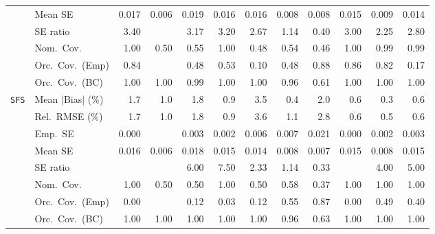 \begin{landscape}
\begin{longtable}{llrrrrrrrrrr}
 & Mean SE & 0.017 & 0.006 & 0.019 & 0.016 & 0.016 & 0.008 & 0.008 & 0.015 & 0.009 & 0.014 \\
 & SE ratio & 3.40 &  & 3.17 & 3.20 & 2.67 & \cellcolor{rankone}1.14 & \cellcolor{ranktwo}0.40 & 3.00 & \cellcolor{rankthree}2.25 & 2.80 \\
 & Nom.\ Cov. & \cellcolor{ranktwo}1.00 & 0.50 & \cellcolor{rankthree}0.55 & \cellcolor{ranktwo}1.00 & 0.48 & 0.54 & 0.46 & \cellcolor{ranktwo}1.00 & \cellcolor{rankone}0.99 & \cellcolor{rankone}0.99 \\
 & Orc.\ Cov.\ (Emp) & \cellcolor{rankthree}0.84 &  & 0.48 & 0.53 & 0.10 & 0.48 & \cellcolor{rankone}0.88 & \cellcolor{ranktwo}0.86 & 0.82 & 0.17 \\
 & Orc.\ Cov.\ (BC) & \cellcolor{rankthree}1.00 & \cellcolor{rankthree}1.00 & \cellcolor{ranktwo}0.99 & \cellcolor{rankthree}1.00 & \cellcolor{rankthree}1.00 & \cellcolor{rankone}0.96 & 0.61 & \cellcolor{rankthree}1.00 & \cellcolor{rankthree}1.00 & \cellcolor{rankthree}1.00 \\
\addlinespace[2pt]
\quad \texttt{SFS} & Mean $|$Bias$|$ (\%) & 1.7 & 1.0 & 1.8 & 0.9 & 3.5 & \cellcolor{ranktwo}0.4 & 2.0 & \cellcolor{rankthree}0.6 & \cellcolor{rankone}0.3 & \cellcolor{rankthree}0.6 \\
 & Rel.\ RMSE (\%) & 1.7 & 1.0 & 1.8 & \cellcolor{rankthree}0.9 & 3.6 & 1.1 & 2.8 & \cellcolor{ranktwo}0.6 & \cellcolor{rankone}0.5 & \cellcolor{ranktwo}0.6 \\
 & Emp.\ SE & 0.000 &  & 0.003 & 0.002 & 0.006 & 0.007 & 0.021 & 0.000 & 0.002 & 0.003 \\
 & Mean SE & 0.016 & 0.006 & 0.018 & 0.015 & 0.014 & 0.008 & 0.007 & 0.015 & 0.008 & 0.015 \\
 & SE ratio &  &  & 6.00 & 7.50 & \cellcolor{rankthree}2.33 & \cellcolor{rankone}1.14 & \cellcolor{ranktwo}0.33 &  & 4.00 & 5.00 \\
 & Nom.\ Cov. & \cellcolor{rankone}1.00 & \cellcolor{rankthree}0.50 & \cellcolor{rankthree}0.50 & \cellcolor{rankone}1.00 & \cellcolor{rankthree}0.50 & \cellcolor{ranktwo}0.58 & 0.37 & \cellcolor{rankone}1.00 & \cellcolor{rankone}1.00 & \cellcolor{rankone}1.00 \\
 & Orc.\ Cov.\ (Emp) & 0.00 &  & 0.12 & 0.03 & 0.12 & \cellcolor{ranktwo}0.55 & \cellcolor{rankone}0.87 & 0.00 & \cellcolor{rankthree}0.49 & 0.40 \\
 & Orc.\ Cov.\ (BC) & \cellcolor{ranktwo}1.00 & \cellcolor{ranktwo}1.00 & \cellcolor{ranktwo}1.00 & \cellcolor{ranktwo}1.00 & \cellcolor{ranktwo}1.00 & \cellcolor{rankone}0.96 & \cellcolor{rankthree}0.63 & \cellcolor{ranktwo}1.00 & \cellcolor{ranktwo}1.00 & \cellcolor{ranktwo}1.00 \\

\end{longtable}
\end{landscape}
